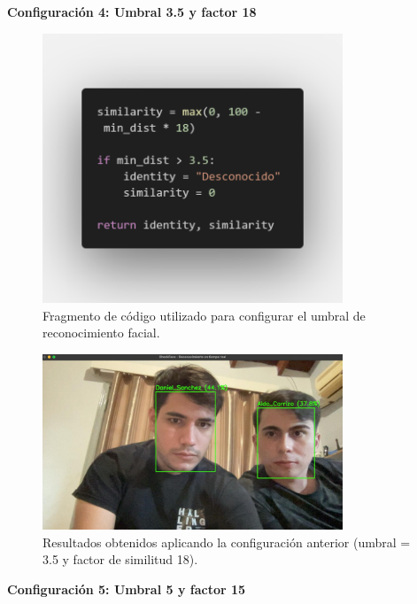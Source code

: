 \newpage


\textbf{Configuración 4: Umbral 3.5 y factor 18}

\begin{figure}[H]
    \centering
    \includegraphics[width=0.8\textwidth]{capitulo_04/imagenes/4.png}
    \caption{Fragmento de código utilizado para configurar el umbral de reconocimiento facial.}
\end{figure}

\begin{figure}[H]
    \centering
    \includegraphics[width=0.8\textwidth]{capitulo_04/imagenes/4.4.jpg}
    \caption{Resultados obtenidos aplicando la configuración anterior (umbral = 3.5 y factor de similitud 18).}
\end{figure}


\newpage


\textbf{Configuración 5: Umbral 5 y factor 15}

